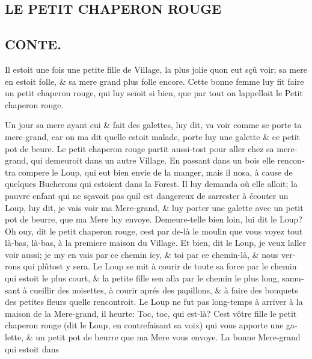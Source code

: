 \documentclass[14pt,a4paper]{memoir}
\newcommand{\notechapter}[1]{%
  \addtonotes{\protect\section*{#1}}%
}
\newcommand{\notesection}[1]{%
  \addtonotes{\protect\par\protect\vspace{2ex}\protect\noindent\textbf{#1}\protect\par\protect\vspace{1ex}}%
}
\begin{document}
{{\begin{otherlanguage}{french}
\chapter{LE PETIT CHAPERON ROUGE}
\notechapter{LE PETIT CHAPERON ROUGE}

\section{CONTE.}
\notesection{CONTE.}

Il estoit une fois une petite fille de Village, la plus jolie
qu\textquotesingle on eut sçû voir; sa mere en estoit folle, \& sa mere
grand plus folle encore. Cette bonne femme luy fit faire un petit
chaperon rouge, qui luy seïoit si bien, que par tout on
l\textquotesingle appelloit le Petit chaperon rouge.

Un jour sa mere ayant cui \& fait des galettes, luy dit, va voir comme
se porte ta mere-grand, car on m\textquotesingle a dit
qu\textquotesingle elle estoit malade, porte luy une galette \& ce petit
pot de beure. Le petit chaperon rouge partit aussi-tost pour aller chez
sa mere-grand, qui demeuroit dans un autre Village. En passant dans un
bois elle rencontra compere le Loup, qui eut bien envie de la manger,
mais il n\textquotesingle osa, à cause de quelques Bucherons qui
estoient dans la Forest. Il luy demanda où elle alloit; la pauvre enfant
qui ne sçavoit pas qu\textquotesingle il est dangereux de
s\textquotesingle arrester à écouter un Loup, luy dit, je vais voir ma
Mere-grand, \& luy porter une galette avec un petit pot de beurre, que
ma Mere luy envoye. Demeure-t\textquotesingle elle bien loin, lui dit le
Loup? Oh ouy, dit le petit chaperon rouge, c\textquotesingle est par
de-là le moulin que vous voyez tout là-bas, là-bas, à la premiere maison
du Village. Et bien, dit le Loup, je veux l\textquotesingle aller voir
aussi; je m\textquotesingle y en vais par ce chemin icy, \& toi par ce
chemin-là, \& nous verrons qui plûtost y sera. Le Loup se mit à courir
de toute sa force par le chemin qui estoit le plus court, \& la petite
fille s\textquotesingle en alla par le chemin le plus long,
s\textquotesingle amusant à cueillir des noisettes, à courir aprés des
papillons, \& à faire des bouquets des petites fleurs
qu\textquotesingle elle rencontroit. Le Loup ne fut pas long-temps à
arriver à la maison de la Mere-grand, il heurte: Toc, toc, qui est-là?
C\textquotesingle est vôtre fille le petit chaperon rouge (dit le Loup,
en contrefaisant sa voix) qui vous apporte une galette, \& un petit pot
de beurre que ma Mere vous envoye. La bonne Mere-grand qui estoit dans

\end{otherlanguage}}}
\end{document}
